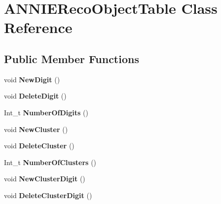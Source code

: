 \hypertarget{classANNIERecoObjectTable}{
\section{ANNIERecoObjectTable Class Reference}
\label{classANNIERecoObjectTable}
}
\subsection*{Public Member Functions}
\begin{DoxyCompactItemize}
\item 
\hypertarget{classANNIERecoObjectTable_ae2e86010f9f57ce6044d084ec40f475b}{
void {\bfseries NewDigit} ()}
\label{classANNIERecoObjectTable_ae2e86010f9f57ce6044d084ec40f475b}

\item 
\hypertarget{classANNIERecoObjectTable_a75f289f8c9eef9098813dbdcc8ddd518}{
void {\bfseries DeleteDigit} ()}
\label{classANNIERecoObjectTable_a75f289f8c9eef9098813dbdcc8ddd518}

\item 
\hypertarget{classANNIERecoObjectTable_a6a91ff418f86119ef35de20c5c9a9e8a}{
Int\_\-t {\bfseries NumberOfDigits} ()}
\label{classANNIERecoObjectTable_a6a91ff418f86119ef35de20c5c9a9e8a}

\item 
\hypertarget{classANNIERecoObjectTable_a4bbb7e3eb5ca8a46486a1087ef2b4ff1}{
void {\bfseries NewCluster} ()}
\label{classANNIERecoObjectTable_a4bbb7e3eb5ca8a46486a1087ef2b4ff1}

\item 
\hypertarget{classANNIERecoObjectTable_a77fe22b611dbc374779bf258eae901a2}{
void {\bfseries DeleteCluster} ()}
\label{classANNIERecoObjectTable_a77fe22b611dbc374779bf258eae901a2}

\item 
\hypertarget{classANNIERecoObjectTable_a87c83bd73d95b7bc2fca9855e8604496}{
Int\_\-t {\bfseries NumberOfClusters} ()}
\label{classANNIERecoObjectTable_a87c83bd73d95b7bc2fca9855e8604496}

\item 
\hypertarget{classANNIERecoObjectTable_ae5d19c03be8a404512ddad75e76be951}{
void {\bfseries NewClusterDigit} ()}
\label{classANNIERecoObjectTable_ae5d19c03be8a404512ddad75e76be951}

\item 
\hypertarget{classANNIERecoObjectTable_ae9e239382fa31db834474b4307959f1b}{
void {\bfseries DeleteClusterDigit} ()}
\label{classANNIERecoObjectTable_ae9e239382fa31db834474b4307959f1b}


\end{DoxyCompactItemize}
